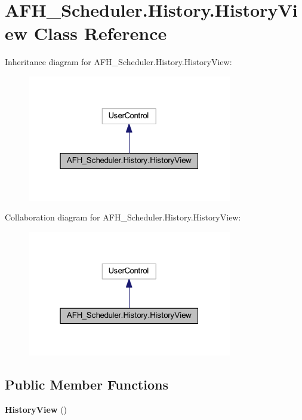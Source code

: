 \section{A\+F\+H\+\_\+\+Scheduler.\+History.\+History\+View Class Reference}
\label{class_a_f_h___scheduler_1_1_history_1_1_history_view}


Inheritance diagram for A\+F\+H\+\_\+\+Scheduler.\+History.\+History\+View\+:
\nopagebreak
\begin{figure}[H]
\begin{center}
\leavevmode
\includegraphics[width=253pt]{class_a_f_h___scheduler_1_1_history_1_1_history_view__inherit__graph}
\end{center}
\end{figure}


Collaboration diagram for A\+F\+H\+\_\+\+Scheduler.\+History.\+History\+View\+:
\nopagebreak
\begin{figure}[H]
\begin{center}
\leavevmode
\includegraphics[width=253pt]{class_a_f_h___scheduler_1_1_history_1_1_history_view__coll__graph}
\end{center}
\end{figure}
\subsection*{Public Member Functions}
\begin{DoxyCompactItemize}
\item 
\textbf{ History\+View} ()
\end{DoxyCompactItemize}


